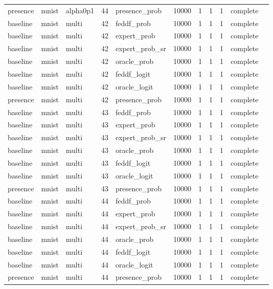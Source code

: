 \begin{tabular}{lllrlrrrrll}
presence & mnist & alpha0p1 & 44 & presence\_prob & 10000 & 1 & 1 & 1 & complete &  \\
baseline & mnist & multi & 42 & feddf\_prob & 10000 & 1 & 1 & 1 & complete &  \\
baseline & mnist & multi & 42 & expert\_prob & 10000 & 1 & 1 & 1 & complete &  \\
baseline & mnist & multi & 42 & expert\_prob\_sr & 10000 & 1 & 1 & 1 & complete &  \\
baseline & mnist & multi & 42 & oracle\_prob & 10000 & 1 & 1 & 1 & complete &  \\
baseline & mnist & multi & 42 & feddf\_logit & 10000 & 1 & 1 & 1 & complete &  \\
baseline & mnist & multi & 42 & oracle\_logit & 10000 & 1 & 1 & 1 & complete &  \\
presence & mnist & multi & 42 & presence\_prob & 10000 & 1 & 1 & 1 & complete &  \\
baseline & mnist & multi & 43 & feddf\_prob & 10000 & 1 & 1 & 1 & complete &  \\
baseline & mnist & multi & 43 & expert\_prob & 10000 & 1 & 1 & 1 & complete &  \\
baseline & mnist & multi & 43 & expert\_prob\_sr & 10000 & 1 & 1 & 1 & complete &  \\
baseline & mnist & multi & 43 & oracle\_prob & 10000 & 1 & 1 & 1 & complete &  \\
baseline & mnist & multi & 43 & feddf\_logit & 10000 & 1 & 1 & 1 & complete &  \\
baseline & mnist & multi & 43 & oracle\_logit & 10000 & 1 & 1 & 1 & complete &  \\
presence & mnist & multi & 43 & presence\_prob & 10000 & 1 & 1 & 1 & complete &  \\
baseline & mnist & multi & 44 & feddf\_prob & 10000 & 1 & 1 & 1 & complete &  \\
baseline & mnist & multi & 44 & expert\_prob & 10000 & 1 & 1 & 1 & complete &  \\
baseline & mnist & multi & 44 & expert\_prob\_sr & 10000 & 1 & 1 & 1 & complete &  \\
baseline & mnist & multi & 44 & oracle\_prob & 10000 & 1 & 1 & 1 & complete &  \\
baseline & mnist & multi & 44 & feddf\_logit & 10000 & 1 & 1 & 1 & complete &  \\
baseline & mnist & multi & 44 & oracle\_logit & 10000 & 1 & 1 & 1 & complete &  \\
presence & mnist & multi & 44 & presence\_prob & 10000 & 1 & 1 & 1 & complete &  \\

\end{tabular}
